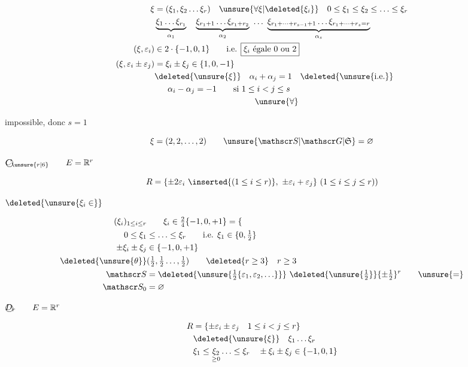 \[
\begin{aligned}
\xi&=(\xi_1,\xi_2\ldots\xi_r)\quad\unsure{\forall\xi|\deleted{\xi_i}}\quad0\leq\xi_1\leq\xi_2\leq\ldots\leq\xi_r\\
&\underbrace{\xi_1\ldots\xi_{r_1}}_{\alpha_1}\quad\underbrace{\xi_{r_1+1}\ldots\xi_{r_1+r_2}}_{\alpha_2}\ \ldots\
\underbrace{\xi_{r_1+\cdots+r_{s-1}+1}\ldots\xi_{r_1+\cdots+r_s=r}}_{\alpha_s}\\
(\xi,\varepsilon_i)&\in 2\cdot\{-1,0,1\}\qquad\text{i.e. }\boxed{\xi_i\text{ égale }0\text{ ou }2}\\
(\xi,\varepsilon_i\pm\varepsilon_j)&=\xi_i\pm\xi_j\in\{1,0,-1\}\\
&\deleted{\unsure{\xi}}\quad\alpha_i+\alpha_j=1\quad\deleted{\unsure{\text{i.e.}}}\\
&\phantom{x}\quad\alpha_i-\alpha_j=-1\qquad\text{si }1\leq i<j\leq s\\
&\hspace{12em}\unsure{\forall}
\end{aligned}
\]

 impossible, donc $s=1$

\[\xi=(2,2,\ldots,2)\qquad\unsure{\mathscr S|\mathscr G|\mathfrak S}=\varnothing\]

$\text{\textcircled{$C_{\unsure{r|6}}$}}\qquad E=\mathbb R^r$

\[
R=\{\pm2\varepsilon_i\ \inserted{(1\leq i\leq r)},\ \pm\varepsilon_i+\varepsilon_j\}\ (1\leq i\leq j\leq r))
\]

\qquad $\deleted{\unsure{\xi_i\in}}$

\[
\begin{aligned}
(\xi_i)_{1\leq i\leq r}&\qquad \xi_i\in\tfrac24\{-1,0,+1\}=\{\\
0\leq\xi_1&\leq\ldots\leq\xi_r\qquad\text{i.e. }\xi_1\in\{0,\tfrac12\}\\
\pm\xi_i\pm\xi_j&\in\{-1,0,+1\}\\
\deleted{\unsure{\theta}}&(\tfrac12,\tfrac12\ldots,\tfrac12)\qquad\deleted{r\geq3}\quad r\geq3\\
\mathscr S&=\deleted{\unsure{\tfrac12\{\varepsilon_1,\varepsilon_2,\ldots\}}}\ \deleted{\unsure{\tfrac12}}\{\pm\tfrac12\}^r\qquad\unsure{=}\\
\mathscr S_0&=\varnothing
\end{aligned}
\]

$\text{\textcircled{$D_r$}}\qquad E=\mathbb R^r$

\[
\begin{aligned}
R&=\{\pm\varepsilon_i\pm\varepsilon_j\quad1\leq i<j\leq r\}\\
&\deleted{\unsure{\xi}}\quad \xi_1\ldots\xi_r\\
&\xi_1\leq\underset{\geq0}{\xi_2}\ldots\leq\xi_r\quad \pm\xi_i\pm\xi_j\in\{-1,0,1\}
\end{aligned}
\]

